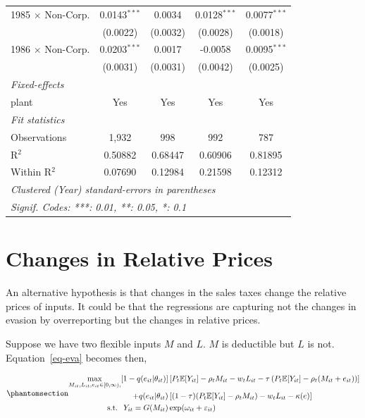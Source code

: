 \documentclass[
  12pt]{article}
\theoremstyle{definition}
\theoremstyle{remark}
\begin{document}
\begin{table}
\begin{minipage}{\linewidth}
\begin{tabular}{lcccc}
   1985 $\times$ Non-Corp.  & 0.0143$^{***}$  & 0.0034          & 0.0128$^{***}$  & 0.0077$^{***}$\\   
                            & (0.0022)        & (0.0032)        & (0.0028)        & (0.0018)\\   
   1986 $\times$ Non-Corp.  & 0.0203$^{***}$  & 0.0017          & -0.0058         & 0.0095$^{***}$\\   
                            & (0.0031)        & (0.0031)        & (0.0042)        & (0.0025)\\   
   \midrule
   \emph{Fixed-effects}\\
   plant                    & Yes             & Yes             & Yes             & Yes\\  
   \midrule
   \emph{Fit statistics}\\
   Observations             & 1,932           & 998             & 992             & 787\\  
   R$^2$                    & 0.50882         & 0.68447         & 0.60906         & 0.81895\\  
   Within R$^2$             & 0.07690         & 0.12984         & 0.21598         & 0.12312\\  
   \midrule \midrule
   \multicolumn{5}{l}{\emph{Clustered (Year) standard-errors in parentheses}}\\
   \multicolumn{5}{l}{\emph{Signif. Codes: ***: 0.01, **: 0.05, *: 0.1}}\\
\end{tabular}
\par\endgroup

\end{minipage}%

\end{table}%

\section{Changes in Relative Prices}\label{changes-in-relative-prices}

An alternative hypothesis is that changes in the sales taxes change the
relative prices of inputs. It could be that the regressions are
capturing not the changes in evasion by overreporting but the changes in
relative prices.

Suppose we have two flexible inputs \(M\) and \(L\). \(M\) is deductible
but \(L\) is not. Equation~\ref{eq-eva} becomes then,

\begin{equation}\phantomsection\label{eq-eva-non-deduct}{
\begin{aligned}
  \max_{M_{it}, L_{it},e_{it}\in [0,\infty), } [1-q(e_{it}|\theta_{it})]&\left[P_t\mathbb{E}[Y_{it}]-\rho_{t} M_{it}-w_{t} L_{it}-\tau\left(P_t\mathbb{E}[Y_{it}]-\rho_{t} (M_{it}+e_{it})\right)\right]\\
  +q(e_{it}|\theta_{it})&\left[(1-\tau)(P_t\mathbb{E}[Y_{it}]-\rho_{t} M_{it})-w_{t} L_{it}-\kappa(e)\right] \\
  \text{s.t. }\; Y_{it}=G(M_{it})&\exp(\omega_{it}+\varepsilon_{it})
\end{aligned}
}\end{equation}
\end{document}
